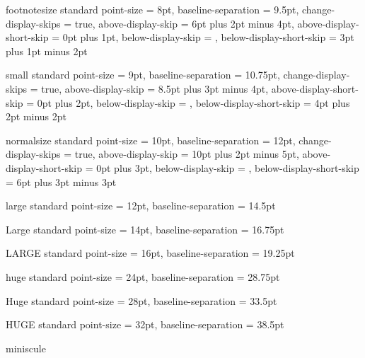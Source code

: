  {footnotesize} {standard}
  {
    point-size               = 8pt,
    baseline-separation      = 9.5pt,
    change-display-skips     = true,
    above-display-skip       = 6pt plus 2pt minus 4pt,
    above-display-short-skip = 0pt plus 1pt,
    below-display-skip       = ,
    below-display-short-skip = 3pt plus 1pt minus 2pt
  }

 {small} {standard}
  {
    point-size               = 9pt,
    baseline-separation      = 10.75pt,
    change-display-skips     = true,
    above-display-skip       = 8.5pt plus 3pt minus 4pt,
    above-display-short-skip = 0pt plus 2pt,
    below-display-skip       = ,
    below-display-short-skip = 4pt plus 2pt minus 2pt
  }

 {normalsize} {standard}
  {
    point-size               = 10pt,
    baseline-separation      = 12pt,
    change-display-skips     = true,
    above-display-skip       = 10pt plus 2pt minus 5pt,
    above-display-short-skip = 0pt plus 3pt,
    below-display-skip       = ,
    below-display-short-skip = 6pt plus 3pt minus 3pt
  }

 {large} {standard}
  {
    point-size          = 12pt,
    baseline-separation = 14.5pt
  }

 {Large} {standard}
  {
    point-size          = 14pt,
    baseline-separation = 16.75pt
  }

 {LARGE} {standard}
  {
    point-size          = 16pt,
    baseline-separation = 19.25pt
  }

 {huge} {standard}
  {
    point-size          = 24pt,
    baseline-separation = 28.75pt
  }

 {Huge} {standard}
  {
    point-size          = 28pt,
    baseline-separation = 33.5pt
  }

 {HUGE} {standard}
  {
    point-size          = 32pt,
    baseline-separation = 38.5pt
  }




%

\NewDocumentCommand \miniscule {}
  { {miniscule}}

